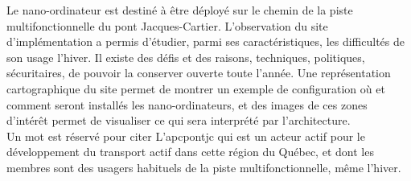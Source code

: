 ﻿\noindent Le nano-ordinateur est destiné à être déployé sur le chemin de la piste multifonctionnelle du pont Jacques-Cartier. L'observation du site d'implémentation a permis d'étudier, parmi ses caractéristiques, les difficultés de son usage l'hiver. Il existe des défis et des raisons, techniques, politiques, sécuritaires, de pouvoir la conserver ouverte toute l'année. Une représentation cartographique du site permet de montrer un exemple de configuration où et comment seront installés les nano-ordinateurs, et des images de ces zones d'intérêt permet de visualiser ce qui sera interprété par l'architecture. 
\vspace{0.5\baselineskip}
\\
\noindent Un mot est réservé pour citer L'\acrlong{apcpontjc} qui est un acteur actif pour le développement du transport actif dans cette région du Québec, et dont les membres sont des usagers habituels de la piste multifonctionnelle, même l'hiver.
